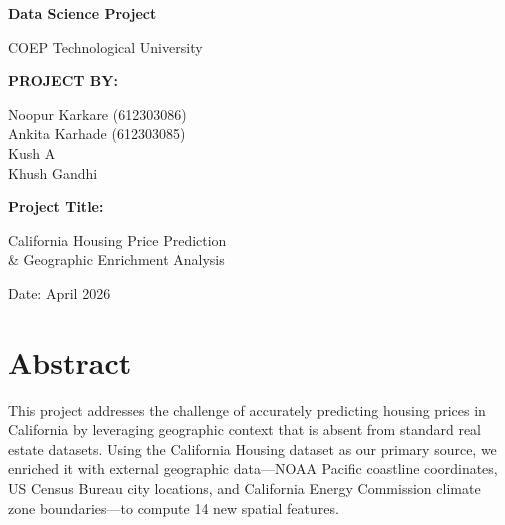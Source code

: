 \documentclass[12pt,a4paper]{article}
\begin{document}
\begin{titlepage}
\centering
\vspace*{2cm}
{\LARGE\bfseries Data Science Project\par}
\vspace{2cm}
{\Large COEP Technological University\par}
\vspace{1.5cm}
{\large\bfseries PROJECT BY:\par}
\vspace{0.5cm}
{\large
Noopur Karkare (612303086)\\
Ankita Karhade (612303085)\\
Kush A\\
Khush Gandhi\par}
\vspace{2cm}
{\Large\bfseries Project Title:\par}
\vspace{0.3cm}
{\LARGE California Housing Price Prediction\\ \& Geographic Enrichment Analysis\par}
\vspace{2cm}
{\large Date: April 2026\par}
\vfill
\end{titlepage}

\tableofcontents
\newpage

\section{Abstract}

This project addresses the challenge of accurately predicting housing prices in California by leveraging geographic context that is absent from standard real estate datasets. Using the California Housing dataset as our primary source, we enriched it with external geographic data---NOAA Pacific coastline coordinates, US Census Bureau city locations, and California Energy Commission climate zone boundaries---to compute 14 new spatial features.
\end{document}
